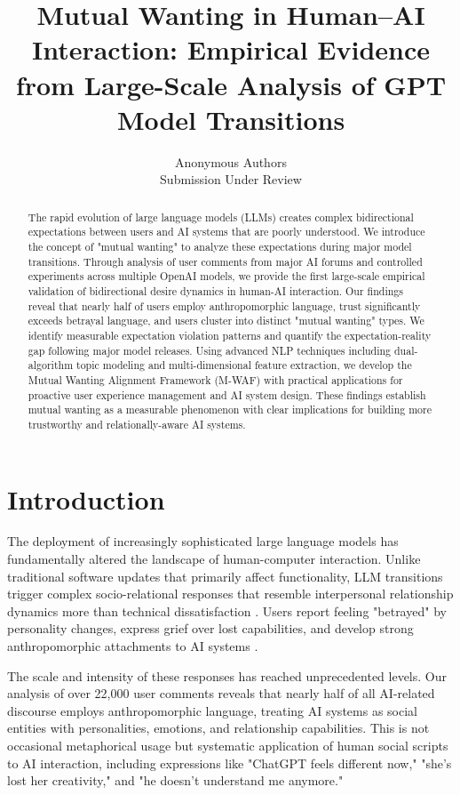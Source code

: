 \documentclass{article}
\title{Mutual Wanting in Human--AI Interaction: Empirical Evidence from Large-Scale Analysis of GPT Model Transitions}
\author{Anonymous Authors\\Submission Under Review}
\begin{document}
\maketitle

\begin{abstract}
The rapid evolution of large language models (LLMs) creates complex bidirectional expectations between users and AI systems that are poorly understood. We introduce the concept of "mutual wanting" to analyze these expectations during major model transitions. Through analysis of user comments from major AI forums and controlled experiments across multiple OpenAI models, we provide the first large-scale empirical validation of bidirectional desire dynamics in human-AI interaction. Our findings reveal that nearly half of users employ anthropomorphic language, trust significantly exceeds betrayal language, and users cluster into distinct "mutual wanting" types. We identify measurable expectation violation patterns and quantify the expectation-reality gap following major model releases. Using advanced NLP techniques including dual-algorithm topic modeling and multi-dimensional feature extraction, we develop the Mutual Wanting Alignment Framework (M-WAF) with practical applications for proactive user experience management and AI system design. These findings establish mutual wanting as a measurable phenomenon with clear implications for building more trustworthy and relationally-aware AI systems.
\end{abstract}

\section{Introduction}

The deployment of increasingly sophisticated large language models has fundamentally altered the landscape of human-computer interaction. Unlike traditional software updates that primarily affect functionality, LLM transitions trigger complex socio-relational responses that resemble interpersonal relationship dynamics more than technical dissatisfaction \citep{nass2000machines, reeves1996media}. Users report feeling "betrayed" by personality changes, express grief over lost capabilities, and develop strong anthropomorphic attachments to AI systems \citep{brandtzaeg2022my, cross2024maladaptive}.

The scale and intensity of these responses has reached unprecedented levels. Our analysis of over 22,000 user comments reveals that nearly half of all AI-related discourse employs anthropomorphic language, treating AI systems as social entities with personalities, emotions, and relationship capabilities. This is not occasional metaphorical usage but systematic application of human social scripts to AI interaction, including expressions like "ChatGPT feels different now," "she's lost her creativity," and "he doesn't understand me anymore."
\end{document}
